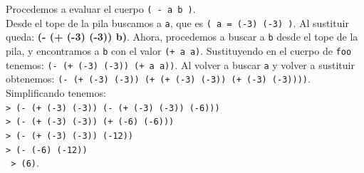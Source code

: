 \documentclass[11pt]{article}
\begin{document}
\begin{enumerate}[leftmargin=0.8cm]
\begin{itemize}
\begin{center}
        \end{center}
        Procedemos a evaluar el cuerpo \texttt{( - a b )}.\\
        Desde el tope de la pila buscamos a \texttt{a}, que es \texttt{( a = (-3) (-3) )}. Al sustituir queda: \textbf{(- (+ (-3) (-3)) b)}. Ahora, procedemos a buscar a \texttt{b} desde el tope de la pila, y encontramos a \texttt{b} con el valor \texttt{(+ a a)}. Sustituyendo en el cuerpo de \texttt{foo} tenemos: \texttt{(- (+ (-3) (-3)) (+ a a))}. Al volver a buscar \texttt{a} y volver a sustituir obtenemos: \texttt{(- (+ (-3) (-3)) (+ (+ (-3) (-3)) (+ (-3) (-3))))}.\\
        Simplificando tenemos:\\ \texttt{> (- (+ (-3) (-3)) (- (+ (-3) (-3)) (-6)))}
        \\ \texttt{> (- (+ (-3) (-3)) (+ (-6) (-6)))}\\
        \texttt{> (- (+ (-3) (-3)) (-12))}
        \\ \texttt{> (- (-6) (-12))}
        \\ \texttt{ > (6)}.

    \end{itemize}
\end{enumerate}
\end{document}
